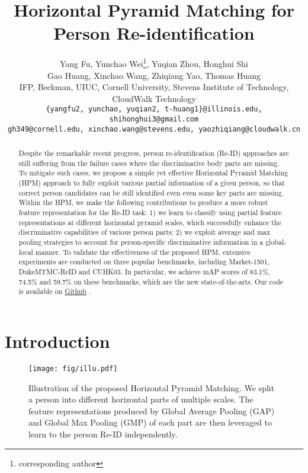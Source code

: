 \documentclass[letterpaper]{article} \usepackage{aaai19}  \usepackage{times}  \usepackage{helvet}  \usepackage{courier}  \usepackage{url}  \usepackage{graphicx}  \frenchspacing  \setlength{\pdfpagewidth}{8.5in}  \setlength{\pdfpageheight}{11in}  \usepackage{multirow}
\begin{document}
\title{Horizontal Pyramid Matching for Person Re-identification}
\author{Yang Fu, Yunchao Wei\thanks{corresponding author}, Yuqian Zhou, Honghui Shi \\ Gao Huang, Xinchao Wang, Zhiqiang Yao, Thomas Huang \\ 
{\small IFP, Beckman, UIUC, Cornell University, Stevens Institute of Technology, CloudWalk Technology}\\
{\tt\small \{yangfu2, yunchao, yuqian2, t-huang1\}@illinois.edu, shihonghui3@gmail.com} \\
{\tt \small gh349@cornell.edu, xinchao.wang@stevens.edu, yaozhiqiang@cloudwalk.cn}
}
\maketitle
 \begin{abstract}
\noindent Despite the remarkable recent progress, person re-identification (Re-ID) approaches are still suffering from the failure cases where the discriminative body parts are missing. To mitigate such cases, we propose a simple yet effective Horizontal Pyramid Matching (HPM) approach to fully exploit various partial information of a given person, so that correct person candidates can be still identified even even some key parts are missing. Within the HPM, we make the following contributions to produce a more robust feature representation for the Re-ID task: 1) we learn to classify using partial feature representations at different horizontal pyramid scales, which successfully enhance the discriminative capabilities of various person parts; 2) we exploit average and max pooling strategies to account for person-specific discriminative information in a global-local manner. To validate the effectiveness of the proposed HPM, extensive experiments are conducted on three popular benchmarks, including Market-1501, DukeMTMC-ReID and CUHK03. In particular, we achieve mAP scores of 83.1\%, 74.5\% and 59.7\% on these benchmarks, which are the new state-of-the-arts. Our code is available on \href{https://github.com/OasisYang/HPM}{Github} .

 \end{abstract}
\section{Introduction}
\begin{figure}[t]
	\centering
	\texttt{[image: fig/illu.pdf]}
	\caption{Illustration of the proposed Horizontal Pyramid Matching. We split a {person} into different horizontal parts of multiple scales. The feature representations produced by Global Average Pooling (GAP) and Global Max Pooling (GMP) of each part are then leveraged to learn to the person Re-ID independently.}
	\vspace{-5mm}
	\label{fig:moti}
\end{figure}
\end{document}
